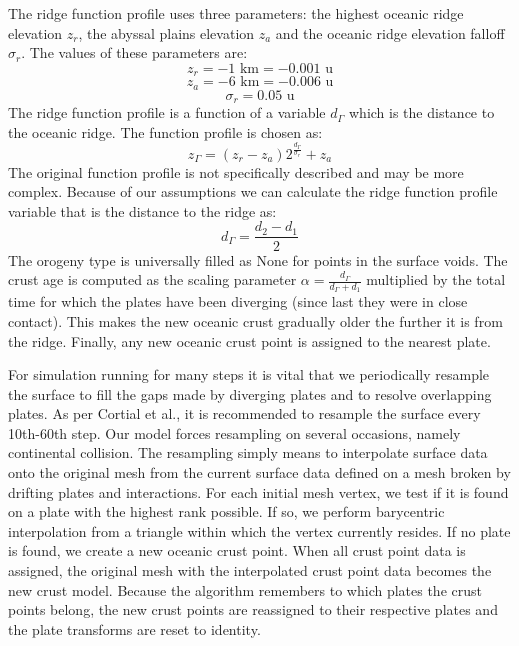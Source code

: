 The ridge function profile uses three parameters: the highest oceanic ridge elevation $z_r$, the abyssal plains elevation $z_a$ and the oceanic ridge elevation falloff $\sigma_r$. The values of these parameters are:
$$z_r=-1\mbox{ km}=-0.001\mbox{ u}$$
$$z_a=-6\mbox{ km}=-0.006\mbox{ u}$$
$$\sigma_r=0.05\mbox{ u}$$
The ridge function profile is a function of a variable $d_\Gamma$ which is the distance to the oceanic ridge. The function profile is chosen as:
$$z_\Gamma=(z_r-z_a)2^{\frac{d_\Gamma}{\sigma_r}}+z_a$$
The original function profile is not specifically described and may be more complex.
Because of our assumptions we can calculate the ridge function profile variable that is the distance to the ridge as:
$$d_\Gamma=\frac{d_2-d_1}{2}$$
The orogeny type is universally filled as None for points in the surface voids. The crust age is computed as the scaling parameter $\alpha=\frac{d_\Gamma}{d_\Gamma+d_1}$ multiplied by the total time for which the plates have been diverging (since last they were in close contact). This makes the new oceanic crust gradually older the further it is from the ridge. Finally, any new oceanic crust point is assigned to the nearest plate.

For simulation running for many steps it is vital that we periodically resample the surface to fill the gaps made by diverging plates and to resolve overlapping plates. As per Cortial et al., it is recommended to resample the surface every 10th-60th step. Our model forces resampling on several occasions, namely continental collision. The resampling simply means to interpolate surface data onto the original mesh from the current surface data defined on a mesh broken by drifting plates and interactions. For each initial mesh vertex, we test if it is found on a plate with the highest rank possible. If so, we perform barycentric interpolation from a triangle within which the vertex currently resides. If no plate is found, we create a new oceanic crust point. When all crust point data is assigned, the original mesh with the interpolated crust point data becomes the new crust model. Because the algorithm remembers to which plates the crust points belong, the new crust points are reassigned to their respective plates and the plate transforms are reset to identity.

